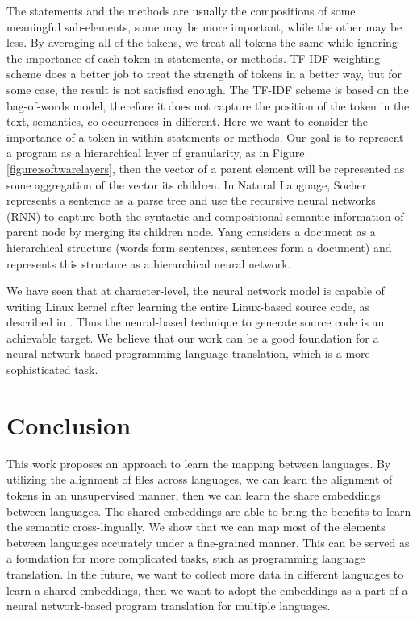The statements and the methods are usually the compositions of some meaningful sub-elements, some may be more important, while the other may be less. By averaging all of the tokens, we treat all tokens the same while ignoring the importance of each token in statements, or methods. TF-IDF weighting scheme does a better job to treat the strength of tokens in a better way, but for some case, the result is not satisfied enough. The TF-IDF scheme is based on the bag-of-words model, therefore it does not capture the position of the token in the text, semantics, co-occurrences in different. Here we want to consider the importance of a token in within statements or methods. Our goal is to represent a program as a hierarchical layer of granularity, as in Figure \ref{figure:softwarelayers}, then the vector of a parent element will be represented as some aggregation of the vector its children. In Natural Language, Socher \cite{socher2011parsing} represents a sentence as a parse tree and use the recursive neural networks (RNN) to capture both the syntactic and compositional-semantic information of parent node by merging its children node. Yang \cite{yang2016hierarchical} considers a document as a hierarchical structure (words form sentences, sentences form a document) and represents this structure as a hierarchical neural network.



We have seen that at character-level, the neural network model is capable of writing Linux kernel after learning the entire Linux-based source code, as described in \cite{Karpathy}. Thus the neural-based technique to generate source code is an achievable target. We believe that our work can be a good foundation for a neural network-based programming language translation, which is a more sophisticated task. 

\section{Conclusion}
This work proposes an approach to learn the mapping between languages. By utilizing the alignment of files across languages, we can learn the alignment of tokens in an unsupervised manner, then we can learn the share embeddings between languages. The shared embeddings are able to bring the benefits to learn the semantic cross-lingually. We show that we can map most of the elements between languages accurately under a fine-grained manner. This can be served as a foundation for more complicated tasks, such as programming language translation. In the future, we want to collect more data in different languages to learn a shared embeddings, then we want to adopt the embeddings as a part of a neural network-based program translation for multiple languages. 



\begin{acks}
	
\end{acks}
